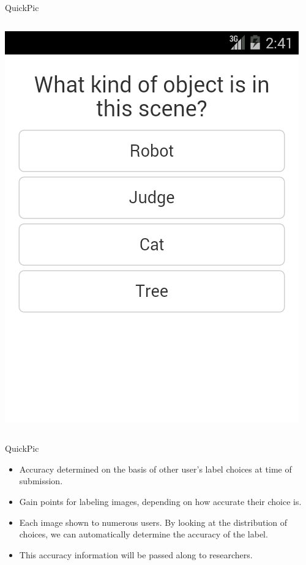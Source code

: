 \documentclass[aspectratio=169]{beamer}
\begin{document}
\begin{frame}{QuickPic}
\begin{columns}[c]
\begin{column}{0.5\columnwidth}
      \includegraphics[width=\textwidth,height=\textheight,keepaspectratio]{ss_quickpic_options}
    \end{column}
  \end{columns}
\end{frame}

\begin{frame}{QuickPic}
  \begin{itemize}
    \item Accuracy determined on the basis of other user's label choices at time
      of submission.

    \item Gain points for labeling images, depending on how accurate their
      choice is.

    \item Each image shown to numerous users. By looking at the distribution of
      choices, we can automatically determine the accuracy of the label.

    \item This accuracy information will be passed along to researchers.

  \end{itemize}
\end{frame}

\end{document}
